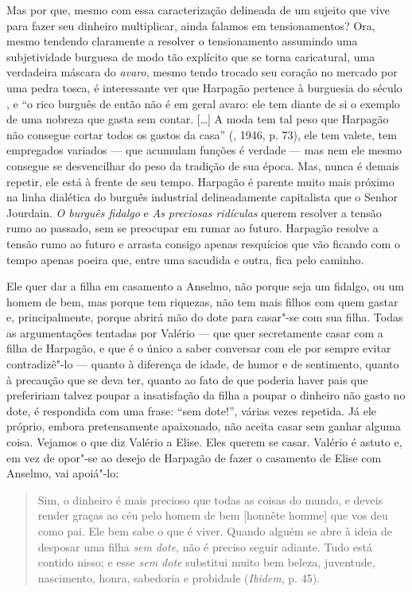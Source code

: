 Mas por que, mesmo com essa caracterização delineada de um sujeito que
vive para fazer seu dinheiro multiplicar, ainda falamos em
tensionamentos? Ora, mesmo tendendo claramente a resolver o
tensionamento assumindo uma subjetividade burguesa de modo tão explícito
que se torna caricatural, uma verdadeira máscara do \emph{avaro}, mesmo
tendo trocado seu coração no mercado por uma pedra tosca, é interessante
ver que Harpagão pertence à burguesia do século , e ``o rico burguês
de então não é em geral avaro: ele tem diante de si o exemplo de uma
nobreza que gasta sem contar. [\ldots{}] A moda tem tal peso que
Harpagão não consegue cortar todos os gastos da casa'' (, 1946,
p. 73), ele tem valete, tem empregados variados --- que acumulam funções
é verdade --- mas nem ele mesmo consegue se desvencilhar do peso da
tradição de sua época. Mas, nunca é demais repetir, ele está à frente de
seu tempo. Harpagão é parente muito mais próximo na linha dialética do
burguês industrial delineadamente capitalista que o Senhor Jourdain.
\emph{O burguês fidalgo} e \emph{As preciosas ridículas} querem resolver
a tensão rumo ao passado, sem se preocupar em rumar ao futuro. Harpagão
resolve a tensão rumo ao futuro e arrasta consigo apenas resquícios que
vão ficando com o tempo apenas poeira que, entre uma sacudida e outra,
fica pelo caminho.

Ele quer dar a filha em casamento a Anselmo, não porque seja um fidalgo,
ou um homem de bem, mas porque tem riquezas, não tem mais filhos com
quem gastar e, principalmente, porque abrirá mão do dote para casar"-se
com sua filha. Todas as argumentações tentadas por Valério --- que quer
secretamente casar com a filha de Harpagão, e que é o único a saber
conversar com ele por sempre evitar contradizê"-lo --- quanto à diferença
de idade, de humor e de sentimento, quanto à precaução que se deva ter,
quanto ao fato de que poderia haver pais que prefeririam talvez poupar a
insatisfação da filha a poupar o dinheiro não gasto no dote, é
respondida com uma frase: ``sem dote!'', várias vezes repetida. Já ele
próprio, embora pretensamente apaixonado, não aceita casar sem ganhar
alguma coisa. Vejamos o que diz Valério a Elise. Eles querem se casar.
Valério é astuto e, em vez de opor"-se ao desejo de Harpagão de fazer o
casamento de Elise com Anselmo, vai apoiá"-lo:

\begin{quote}
Sim, o dinheiro é mais precioso que todas as coisas do mundo, e deveis
render graças ao céu pelo homem de bem [honnête homme] que vos deu
como pai. Ele bem sabe o que é viver. Quando alguém se abre à ideia de
desposar uma filha \emph{sem} \emph{dote}, não é preciso seguir adiante.
Tudo está contido nisso; e esse \emph{sem dote} substitui muito bem
beleza, juventude, nascimento, honra, sabedoria e probidade
(\emph{Ibidem}, p. 45).
\end{quote}

